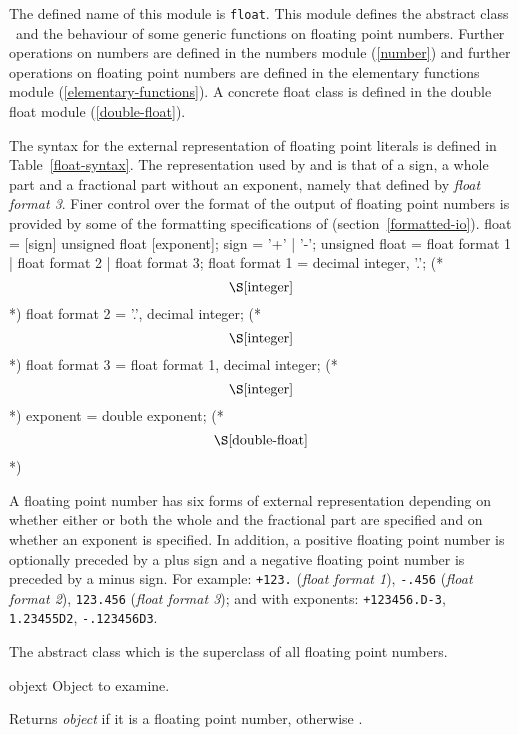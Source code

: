 \label{float}
%
\begin{optDefinition}
\noindent
The defined name of this module is {\tt float}.  This module defines the
abstract class \ and the behaviour of some generic functions on
floating point numbers.  Further operations on numbers are defined in the
numbers module (\ref{number}) and further operations on floating point numbers
are defined in the elementary functions module (\ref{elementary-functions}).  A
concrete float class is defined in the double float module (\ref{double-float}).

%
The syntax for the external representation of floating point literals is defined
in Table~\ref{float-syntax}.  The representation used by  and
 is that of a sign, a whole part and a fractional part without
an exponent, namely that defined by {\em float format 3}.  Finer control over
the format of the output of floating point numbers is provided by some of the
formatting specifications of  (section~\ref{formatted-io}).
%
\Syntax
\label{float-syntax}
\savesyntax\floatSyntax\vbox{\small\syntax
float
   = [sign] unsigned float [exponent];
sign
   = '+' | '-';
unsigned float
   = float format 1
   | float format 2
   | float format 3;
float format 1
   = decimal integer, '.'; (* \[\S\ref{integer}\] *)
float format 2
   = '.', decimal integer; (* \[\S\ref{integer}\] *)
float format 3
   = float format 1, decimal integer; (* \[\S\ref{integer}\] *)
exponent
   = double exponent; (* \[\S\ref{double-float}\] *)
\endsyntax}

A floating point number
has six forms of external representation depending on whether either or both the
whole and the fractional part are specified and on whether an exponent is
specified.  In addition, a positive floating point number is optionally preceded
by a plus sign and a negative floating point number is preceded by a minus sign.
For example:
%
\verb|+123.| ({\em float format 1\/}),
\verb|-.456| ({\em float format 2\/}),
\verb|123.456| ({\em float format 3\/}); and with exponents:
\verb|+123456.D-3|,
\verb|1.23455D2|,
\verb|-.123456D3|.

%
The abstract class which is the superclass of all floating point
numbers.
%
\begin{arguments}
    \item[objext] Object to examine.
\end{arguments}
%
\result%
Returns {\em object\/} if it is a floating point number, otherwise \nil.


\end{optDefinition}

